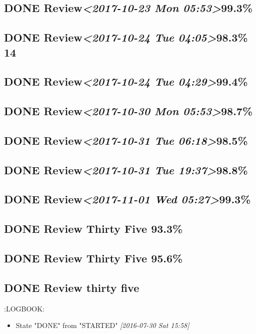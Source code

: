 \documentclass[11pt]{ctexart}
\begin{document}
\subsection{{\bfseries\sffamily DONE} Review\textit{<2017-10-23 Mon 05:53>}99.3\%}
\label{sec:org1731d5e}
\subsection{{\bfseries\sffamily DONE} Review\textit{<2017-10-24 Tue 04:05>}98.3\% 14}
\label{sec:org0498a2e}
\subsection{{\bfseries\sffamily DONE} Review\textit{<2017-10-24 Tue 04:29>}99.4\%}
\label{sec:org4c5a4a9}
\subsection{{\bfseries\sffamily DONE} Review\textit{<2017-10-30 Mon 05:53>}98.7\%}
\label{sec:orgfc8ebc9}
\subsection{{\bfseries\sffamily DONE} Review\textit{<2017-10-31 Tue 06:18>}98.5\%}
\label{sec:org00d9f19}
\subsection{{\bfseries\sffamily DONE} Review\textit{<2017-10-31 Tue 19:37>}98.8\%}
\label{sec:orga3840a7}
\subsection{{\bfseries\sffamily DONE} Review\textit{<2017-11-01 Wed 05:27>}99.3\%}
\label{sec:org85fdccc}
\subsection{{\bfseries\sffamily DONE} Review Thirty Five 93.3\%}
\label{sec:org822a2bf}
\subsection{{\bfseries\sffamily DONE} Review Thirty Five 95.6\%}
\label{sec:org0bf6ace}
\subsection{{\bfseries\sffamily DONE} Review thirty five}
\label{sec:orga3c9897}
:LOGBOOK:
\begin{itemize}
\item State "DONE"       from "STARTED"    \textit{[2016-07-30 Sat 15:58]}
\end{itemize}
\end{document}
